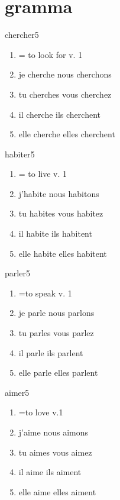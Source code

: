 \documentclass[./templates/main.tex]{subfiles}
\begin{document}
\section{gramma}
\begin{word}{chercher}{\myftipa{}}{5}\label{wo:parler}
  \begin{enumerate}[label=(\arabic*)]
    \item = to look for v. 1
    \item je cherche nous cherchons
    \item tu cherches vous cherchez
    \item il cherche ils cherchent
    \item elle cherche elles cherchent
  \end{enumerate}
\end{word}
\begin{word}{habiter}{}{5}\label{wo:habiter}
  \begin{enumerate}[label=(\arabic*)]
    \item = to live v. 1
    \item j'habite nous habitons
    \item tu habites vous habitez
    \item il habite ils habitent
    \item elle habite elles habitent
  \end{enumerate}
\end{word}
\begin{word}{parler}{}{5}\label{wo:parler}
  \begin{enumerate}[label=(\arabic*)]
    \item =to speak v. 1
    \item je parle nous parlons
    \item tu parles vous parlez
    \item il parle ils parlent
    \item elle parle elles parlent
  \end{enumerate}
\end{word}
\begin{word}{aimer}{}{5}\label{wo:aimer}
  \begin{enumerate}[label=(\arabic*)]
    \item =to love v.1
    \item j'aime nous aimons
    \item tu aimes vous aimez
    \item il aime ils aiment
    \item elle aime elles aiment
  \end{enumerate}
\end{word}
\end{document}
